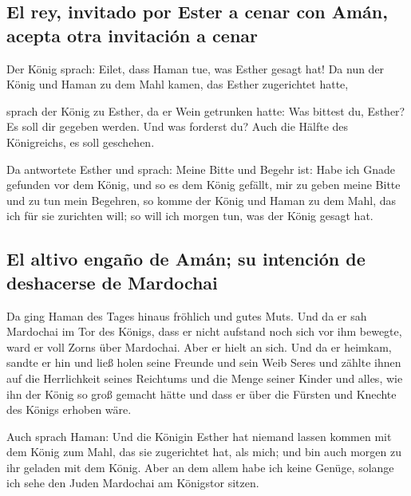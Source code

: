 \hypertarget{el-rey-invitado-por-ester-a-cenar-con-amuxe1n-acepta-otra-invitaciuxf3n-a-cenar}{%
\subsection{El rey, invitado por Ester a cenar con Amán, acepta otra
invitación a
cenar}\label{el-rey-invitado-por-ester-a-cenar-con-amuxe1n-acepta-otra-invitaciuxf3n-a-cenar}}

 Der König sprach: Eilet, dass Haman tue, was Esther
gesagt hat! Da nun der König und Haman zu dem Mahl kamen, das Esther
zugerichtet hatte,

 sprach der König zu Esther, da er Wein getrunken hatte:
Was bittest du, Esther? Es soll dir gegeben werden. Und was forderst du?
Auch die Hälfte des Königreichs, es soll geschehen.

 Da antwortete Esther und sprach: Meine Bitte und Begehr
ist:  Habe ich Gnade gefunden vor dem König, und so es dem
König gefällt, mir zu geben meine Bitte und zu tun mein Begehren, so
komme der König und Haman zu dem Mahl, das ich für sie zurichten will;
so will ich morgen tun, was der König gesagt hat.

\hypertarget{el-altivo-engauxf1o-de-amuxe1n-su-intenciuxf3n-de-deshacerse-de-mardochai}{%
\subsection{El altivo engaño de Amán; su intención de deshacerse de
Mardochai}\label{el-altivo-engauxf1o-de-amuxe1n-su-intenciuxf3n-de-deshacerse-de-mardochai}}

 Da ging Haman des Tages hinaus fröhlich und gutes Muts.
Und da er sah Mardochai im Tor des Königs, dass er nicht aufstand noch
sich vor ihm bewegte, ward er voll Zorns über Mardochai. 
Aber er hielt an sich. Und da er heimkam, sandte er hin und ließ holen
seine Freunde und sein Weib Seres  und zählte ihnen auf
die Herrlichkeit seines Reichtums und die Menge seiner Kinder und alles,
wie ihn der König so groß gemacht hätte und dass er über die Fürsten und
Knechte des Königs erhoben wäre.

 Auch sprach Haman: Und die Königin Esther hat niemand
lassen kommen mit dem König zum Mahl, das sie zugerichtet hat, als mich;
und bin auch morgen zu ihr geladen mit dem König.  Aber
an dem allem habe ich keine Genüge, solange ich sehe den Juden Mardochai
am Königstor sitzen.

